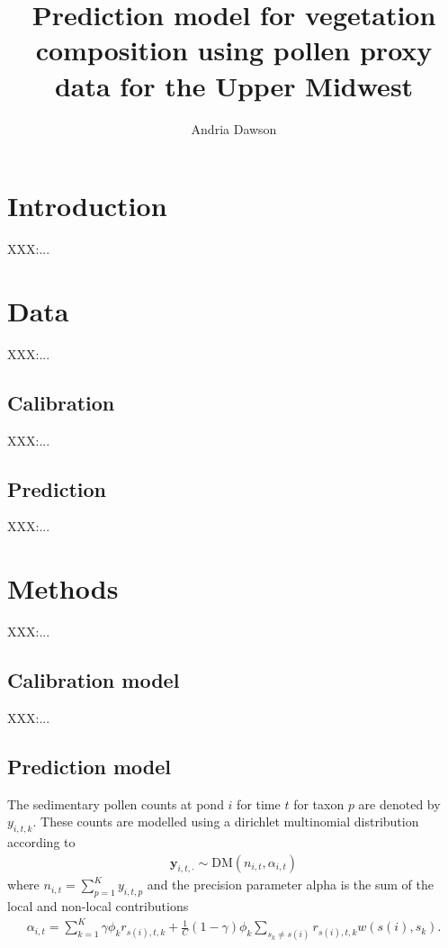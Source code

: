 \documentclass[12pt]{article}
\begin{document}
\nocite{*}

\title{Prediction model for vegetation composition using pollen proxy data for the Upper Midwest}

\author{Andria Dawson}

\maketitle

\section{Introduction}

XXX:...


\section{Data}

XXX:...

\subsection{Calibration}

XXX:...

\subsection{Prediction}

XXX:...

\section{Methods}

XXX:...

\subsection{Calibration model}

XXX:...

\subsection{Prediction model}

The sedimentary pollen counts at pond $i$ for time $t$ for taxon $p$ are denoted by $y_{i,t,k}$. These counts are modelled using a dirichlet multinomial distribution according to
\begin{align*}
 \bm{y}_{i,t,\cdot} \sim \text{DM} ( n_{i,t}, \alpha_{i,t} )
\end{align*}
where $n_{i,t} = \sum_{p=1}^{K} y_{i,t,p}$ and the precision parameter alpha is the sum of the local and non-local contributions
\begin{align*}
\alpha_{i,t} = \sum_{k=1}^{K} \gamma \phi_k r_{s(i),t,k} + \frac{1}{C} (1- \gamma) \phi_k \sum_{s_k \neq s(i)} r_{s(i),t,k} w(s(i), s_k).
\end{align*}
\end{document}

